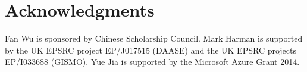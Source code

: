 \documentclass{sig-alternate}
\begin{document}













\section{Acknowledgments}
Fan Wu is sponsored by Chinese Scholarship Council.
Mark Harman is supported by the UK EPSRC project EP/J017515 (DAASE) and the UK EPSRC projects EP/I033688 (GISMO).
Yue Jia is supported by the Microsoft Azure Grant 2014.

%
\small

%
%

\balancecolumns
\end{document}

